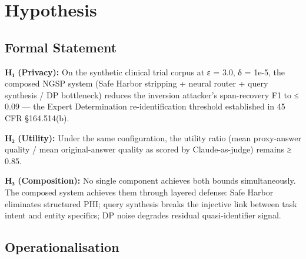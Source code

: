 \section{Hypothesis}\label{hypothesis}

\subsection{Formal Statement}\label{formal-statement}

\textbf{H₁ (Privacy):} On the synthetic clinical trial corpus at ε =
3.0, δ = 1e-5, the composed NGSP system (Safe Harbor stripping + neural
router + query synthesis / DP bottleneck) reduces the inversion
attacker's span-recovery F1 to ≤ 0.09 --- the Expert Determination
re-identification threshold established in 45 CFR §164.514(b).

\textbf{H₂ (Utility):} Under the same configuration, the utility ratio
(mean proxy-answer quality / mean original-answer quality as scored by
Claude-as-judge) remains ≥ 0.85.

\textbf{H₃ (Composition):} No single component achieves both bounds
simultaneously. The composed system achieves them through layered
defense: Safe Harbor eliminates structured PHI; query synthesis breaks
the injective link between task intent and entity specifics; DP noise
degrades residual quasi-identifier signal.

\subsection{Operationalisation}\label{operationalisation}

